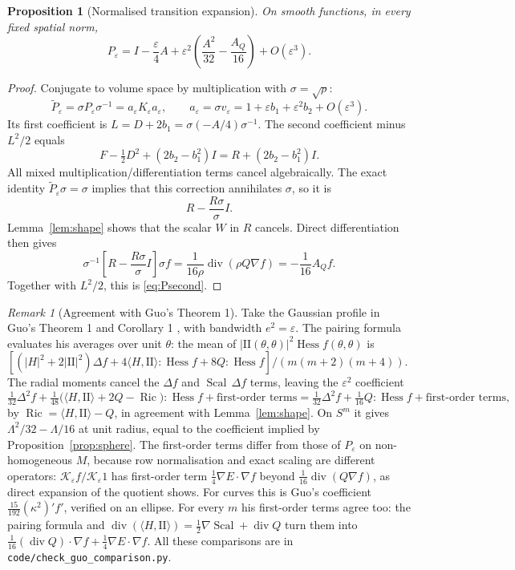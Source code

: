 \documentclass[11pt,a4paper]{article}
\newtheorem{proposition}[theorem]{Proposition}
\theoremstyle{definition}\newtheorem{definition}[theorem]{Definition}
\theoremstyle{remark}\newtheorem{remark}[theorem]{Remark}
\newcommand{\eps}{\varepsilon}
\newcommand{\diver}{\operatorname{div}}
\newcommand{\II}{\mathrm{II}}
\newcommand{\Ric}{\operatorname{Ric}}
\newcommand{\Scal}{\operatorname{Scal}}
\begin{document}
\begin{proposition}[Normalised transition expansion]\label{prop:Psecond}
On smooth functions, in every fixed spatial norm,
\begin{equation}\label{eq:Psecond}
P_\eps=I-\frac\eps4A+\eps^2\left(\frac{A^2}{32}-\frac{A_Q}{16}\right)+O(\eps^3).
\end{equation}
\end{proposition}
\begin{proof}
Conjugate to volume space by multiplication with $\sigma=\sqrt\rho$:
\[
\widetilde P_\eps=\sigma P_\eps\sigma^{-1}=a_\eps K_\eps a_\eps,
\qquad a_\eps=\sigma v_\eps=1+\eps b_1+\eps^2b_2+O(\eps^3).
\]
Its first coefficient is $L=D+2b_1=\sigma(-A/4)\sigma^{-1}$.
The second coefficient minus $L^2/2$ equals
\[
F-\tfrac12D^2+(2b_2-b_1^2)I=R+(2b_2-b_1^2)I.
\]
All mixed multiplication/differentiation terms cancel algebraically. The exact identity $\widetilde P_\eps\sigma=\sigma$ implies that this correction annihilates $\sigma$, so it is
\[
R-\frac{R\sigma}{\sigma}I.
\]
Lemma~\ref{lem:shape} shows that the scalar $W$ in $R$ cancels. Direct differentiation then gives
\[
\sigma^{-1}\left[R-\frac{R\sigma}{\sigma}I\right]\sigma f
=\frac1{16\rho}\diver(\rho Q\nabla f)=-\frac1{16}A_Qf.
\]
Together with $L^2/2$, this is \eqref{eq:Psecond}.
\end{proof}

\begin{remark}[Agreement with Guo's Theorem 1]\label{rem:guo}
Take the Gaussian profile in Guo's Theorem 1 and Corollary 1 \cite{Guo}, with bandwidth $e^2=\eps$. The pairing formula evaluates his averages over unit $\theta$: the mean of $|\II(\theta,\theta)|^2\operatorname{Hess}f(\theta,\theta)$ is $[(|H|^2+2|\II|^2)\Delta f+4\langle H,\II\rangle{:}\operatorname{Hess}f+8Q{:}\operatorname{Hess}f]/(m(m+2)(m+4))$. The radial moments cancel the $\Delta f$ and $\Scal\,\Delta f$ terms, leaving the $\eps^2$ coefficient
\[
\tfrac1{32}\Delta^2f+\tfrac1{48}\bigl(\langle H,\II\rangle+2Q-\Ric\bigr){:}\operatorname{Hess}f+\text{first-order terms}
=\tfrac1{32}\Delta^2f+\tfrac1{16}Q{:}\operatorname{Hess}f+\text{first-order terms},
\]
by $\Ric=\langle H,\II\rangle-Q$, in agreement with Lemma~\ref{lem:shape}. On $S^m$ it gives $\Lambda^2/32-\Lambda/16$ at unit radius, equal to the coefficient implied by Proposition~\ref{prop:sphere}. The first-order terms differ from those of $P_\eps$ on non-homogeneous $M$, because row normalisation and exact scaling are different operators: $\mathcal K_\eps f/\mathcal K_\eps1$ has first-order term $\tfrac14\nabla E\cdot\nabla f$ beyond $\tfrac1{16}\diver(Q\nabla f)$, as direct expansion of the quotient shows. For curves this is Guo's coefficient $\tfrac{15}{192}(\kappa^2)'f'$, verified on an ellipse. For every $m$ his first-order terms agree too: the pairing formula and $\diver(\langle H,\II\rangle)=\tfrac12\nabla\Scal+\diver Q$ turn them into $\tfrac1{16}(\diver Q)\cdot\nabla f+\tfrac14\nabla E\cdot\nabla f$. All these comparisons are in \texttt{code/check\_guo\_comparison.py}.
\end{remark}
\end{document}
